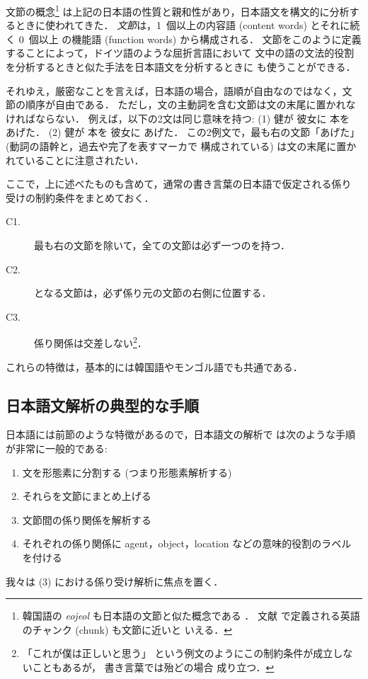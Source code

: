 \documentclass[japanese]{jnlp_1.2c}
\begin{document}
文節の概念\footnote{
韓国語の {\em eojeol} も日本語の文節と似た概念である \cite{Yoon1999}．
文献 \cite{Abney1991} で定義される英語のチャンク (chunk) も文節に近いと
いえる．}
は上記の日本語の性質と親和性があり，日本語文を構文的に分析するときに使われてきた．
{\em 文節}は，1~個以上の内容語 (content words) とそれに続く 0~個以上
の機能語 (function words) から構成される．
文節をこのように定義することによって，ドイツ語のような屈折言語において
文中の語の文法的役割を分析するときと似た手法を日本語文を分析するときに
も使うことができる．

それゆえ，厳密なことを言えば，日本語の場合，語順が自由なのではなく，文
節の順序が自由である．
ただし，文の主動詞を含む文節は文の末尾に置かれなければならない．
例えば，以下の2文は同じ意味を持つ:
(1) 健が 彼女に 本を あげた． (2) 健が 本を 彼女に あげた．
この2例文で，最も右の文節「あげた」 (動詞の語幹と，過去や完了を表すマーカで
構成されている) は文の末尾に置かれていることに注意されたい．

ここで，上に述べたものも含めて，通常の書き言葉の日本語で仮定される係り
受けの制約条件をまとめておく．
\begin{description} 
\item[C1.] 最も右の文節を除いて，全ての文節は必ず一つの\TermHead{}を持つ．
\item[C2.] \TermHead{}となる文節は，必ず係り元の文節の右側に位置する．
\item[C3.] 係り関係は交差しない\footnote{
「これが僕は正しいと思う」
という例文のようにこの制約条件が成立しないこともあるが，
書き言葉では殆どの場合
成り立つ\cite[187ページ]{Nagao1996}．}．
\end{description}
これらの特徴は，基本的には韓国語やモンゴル語でも共通である．

\subsection{日本語文解析の典型的な手順}
日本語には前節のような特徴があるので，日本語文の解析で
は次のような手順が非常に一般的である:
\begin{enumerate}
\item 文を形態素に分割する (つまり形態素解析する)
\item それらを文節にまとめ上げる
\item 文節間の係り関係を解析する
\item それぞれの係り関係に agent，object，location などの意味的役割のラベル
を付ける
\end{enumerate}
我々は (3) における係り受け解析に焦点を置く．
\end{document}
